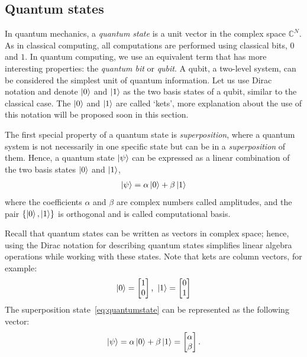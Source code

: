 \documentclass[cryptography,review,submit,pdftex,moreauthors,amsmath,amssymb,aps,strict]{Definitions/mdpi}
\begin{document}
\subsection{Quantum states}

In quantum mechanics, a \textit{quantum state} is a unit vector in the complex space $\mathbb{C}^N$.
As in classical computing, all computations are performed using classical bits, $0$ and $1$. In quantum computing, we use an equivalent term that has more interesting properties: the \textit{quantum bit} or \textit{qubit}. A qubit, a two-level system, can be considered the simplest unit of quantum information. Let us use Dirac notation and denote $\ket{0}$ and $\ket{1}$ as the two basis states of a qubit, similar to the classical case. The $\ket{0}$ and $\ket{1}$ are called `kets', more explanation about the use of this notation will be proposed soon in this section.

The first special property of a quantum state is \textit{superposition}, where a quantum system is not necessarily in one specific state but can be in a \textit{superposition} of them. Hence, a quantum state $\ket{\psi}$ can be expressed as a linear combination of the two basis states $\ket{0}$ and $\ket{1}$,
\begin{align}
\ket{\psi}=\alpha\ket{0}+\beta\ket{1}
\label{eq:quantumstate}
\end{align}
where the coefficients $\alpha$ and $\beta$ are complex numbers called amplitudes, and the pair $\{\ket{0},\ket{1}\}$ is orthogonal and is called computational basis.


\noindent Recall that quantum states can be written as vectors in complex space; hence, using the Dirac notation for describing quantum states simplifies linear algebra operations while working with these states. Note that kets are column vectors, for example:
\begin{align}
    \ket{0}=\begin{bmatrix} 1\\ 0
\end{bmatrix} \text{, }\ket{1}=\begin{bmatrix} 0\\1
\end{bmatrix}
\end{align}
The superposition state~\eqref{eq:quantumstate} can be represented as the following vector:
\begin{align}
    \ket{\psi}=\alpha\ket{0}+\beta\ket{1} = \begin{bmatrix} \alpha\\ \beta
\end{bmatrix}.
\end{align}
\end{document}
